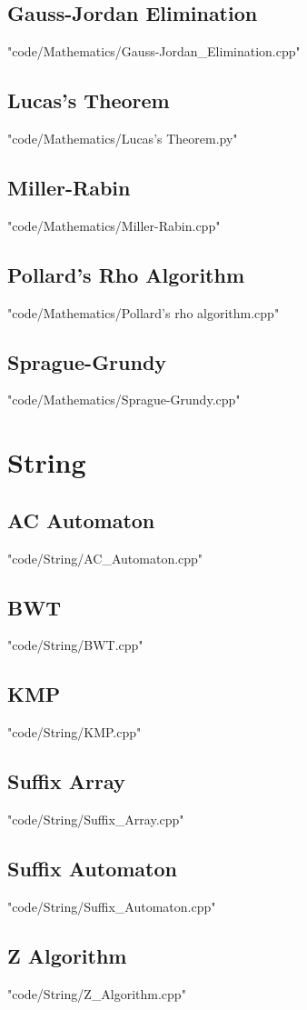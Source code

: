 \documentclass [landscape,8pt,a4paper,twocolumn]{article}
\begin{document}
\subsection{Gauss-Jordan Elimination}
 {"code/Mathematics/Gauss-Jordan_Elimination.cpp"}
\subsection{Lucas's Theorem}
 {"code/Mathematics/Lucas's Theorem.py"}
\subsection{Miller-Rabin}
 {"code/Mathematics/Miller-Rabin.cpp"}
\subsection{Pollard's Rho Algorithm}
 {"code/Mathematics/Pollard's rho algorithm.cpp"}
\subsection{Sprague-Grundy}
 {"code/Mathematics/Sprague-Grundy.cpp"}
\section{String}
\subsection{AC Automaton}
 {"code/String/AC_Automaton.cpp"}
\subsection{BWT}
 {"code/String/BWT.cpp"}
\subsection{KMP}
 {"code/String/KMP.cpp"}
\subsection{Suffix Array}
 {"code/String/Suffix_Array.cpp"}
\subsection{Suffix Automaton}
 {"code/String/Suffix_Automaton.cpp"}
\subsection{Z Algorithm}
 {"code/String/Z_Algorithm.cpp"}


\end{document}
